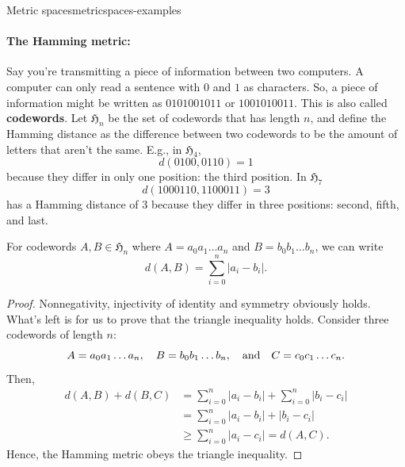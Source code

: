 \begin{exmp}{Metric spaces}{metricspaces-examples}
  \paragraph{The Hamming metric:}

  Say you're transmitting a piece of information between two computers. A computer can
  only read a sentence with \(0\) and \(1\) as characters. So, a piece of information
  might be written as \(0101001011\) or \(1001010011\). This is also called \textbf{codewords}.
  Let \(\mathfrak{H}_n\) be the set of codewords that has length \(n\), and define the
  Hamming distance as the difference between two codewords to be the amount of
  letters that aren't the same. E.g., in \(\mathfrak{H}_4\),
  \begin{equation}
    d(0100, 0110) = 1
  \end{equation}
  because they differ in only one position: the third position. In \(\mathfrak{H}_7\)
  \begin{equation}
    d(1000110, 1100011) = 3
  \end{equation}
  has a Hamming distance of \(3\) because they differ in three positions: second, fifth, and last.

  For codewords \(A, B \in \mathfrak{H}_n\) where \(A = a_0 a_1 \dots a_n\) and
  \(B = b_0 b_1 \dots b_n\), we can write
  \begin{equation}
    d(A, B) = \sum_{i=0}^n |a_i - b_i|.
  \end{equation}

  \begin{proof}
    Nonnegativity, injectivity of identity and symmetry obviously holds. What's left
    is for us to prove that the triangle inequality holds. Consider three codewords of length \(n\):
    \begin{equation}
      A = a_0 a_1 \dots a_n, \quad B = b_0 b_1 \dots b_n, \quad\textrm{and}\quad C = c_0 c_1 \dots c_n.
    \end{equation}
    Then,
    \begin{align}
      d(A, B) + d(B, C) & = \sum_{i=0}^n |a_i - b_i| + \sum_{i=0}^n |b_i - c_i| \\
                        & = \sum_{i=0}^n |a_i - b_i| + |b_i - c_i|              \\
                        & \geq \sum_{i=0}^n |a_i - c_i| = d(A, C).
    \end{align}
    Hence, the Hamming metric obeys the triangle inequality.
  \end{proof}
\end{exmp}

